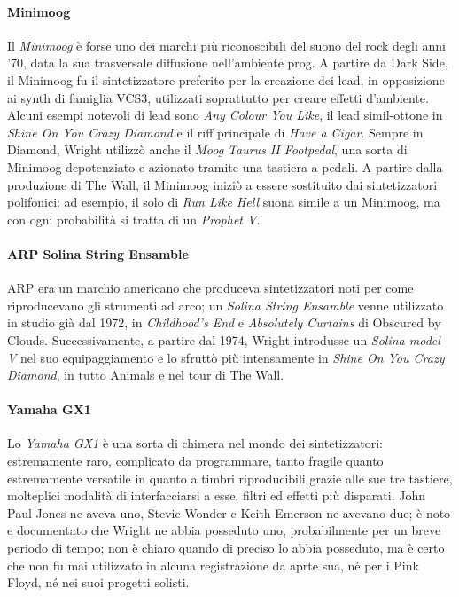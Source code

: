 \documentclass[class=book, crop=false, oneside, 12pt]{standalone}
\begin{document}
    \paragraph{Minimoog}
    Il \emph{Minimoog} è forse uno dei marchi più riconoscibili del suono del rock degli anni '70, data la sua trasversale diffusione nell'ambiente prog. A partire da Dark Side, il Minimoog fu il sintetizzatore preferito per la creazione dei lead, in opposizione ai synth di famiglia VCS3, utilizzati soprattutto per creare effetti d'ambiente. Alcuni esempi notevoli di lead sono \emph{Any Colour You Like}, il lead simil-ottone in \emph{Shine On You Crazy Diamond} e il riff principale di \emph{Have a Cigar}. Sempre in Diamond, Wright utilizzò anche il \emph{Moog Taurus II Footpedal}, una sorta di Minimoog depotenziato  e azionato tramite una tastiera a pedali. A partire dalla produzione di The Wall, il Minimoog iniziò a essere sostituito dai sintetizzatori polifonici: ad esempio, il solo di \emph{Run Like Hell} suona simile a un Minimoog, ma con ogni probabilità si tratta di un \emph{Prophet V}.

    \paragraph{ARP Solina String Ensamble}
    ARP era un marchio americano che produceva sintetizzatori noti per come riproducevano gli strumenti ad arco; un \emph{Solina String Ensamble} venne utilizzato in studio già dal 1972, in \emph{Childhood's End} e \emph{Absolutely Curtains} di Obscured by Clouds. Successivamente, a partire dal 1974, Wright introdusse un \emph{Solina model V} nel suo equipaggiamento e lo sfruttò più intensamente in \emph{Shine On You Crazy Diamond}, in tutto Animals e nel tour di The Wall.

    \paragraph{Yamaha GX1}
    Lo \emph{Yamaha GX1} è una sorta di chimera nel mondo dei sintetizzatori: estremamente raro, complicato da programmare, tanto fragile quanto estremamente versatile in quanto a timbri riproducibili grazie alle sue tre tastiere, molteplici modalità di interfacciarsi a esse, filtri ed effetti più disparati. John Paul Jones ne aveva uno, Stevie Wonder e Keith Emerson ne avevano due; è noto e documentato che Wright ne abbia posseduto uno, probabilmente per un breve periodo di tempo; non è chiaro quando di preciso lo abbia posseduto, ma è certo che non fu mai utilizzato in alcuna registrazione da aprte sua, né per i Pink  Floyd, né nei suoi progetti solisti.
\end{document}
